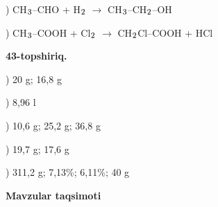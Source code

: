 \documentclass[11pt,a4paper]{article}
\renewcommand{\textsubscript}[1]{\ensuremath{_{\text{\fontsize{8}{8}\selectfont #1}}}}
\begin{document}
) CH\textsubscript{3}--CHO + H\textsubscript{2} $\to$ CH\textsubscript{3}--CH\textsubscript{2}--OH\par
{}) CH\textsubscript{3}--COOH + Cl\textsubscript{2} $\to$ CH\textsubscript{2}Cl--COOH + HCl\par
\noindent\textbf{43-topshiriq.}\par
{}) 20 g; 16,8 g\par
{}) 8,96 l\par
{}) 10,6 g; 25,2 g; 36,8 g\par
{}) 19,7 g; 17,6 g\par
{}) 311,2 g; 7,13\%; 6,11\%; 40 g\par
\par\bigskip\noindent\textbf{Mavzular taqsimoti}\par\smallskip
\end{document}
